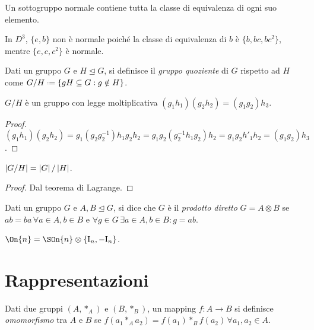 Un sottogruppo normale contiene tutta la classe di equivalenza di ogni suo elemento.

\begin{example}
	In $ D^3 $, $ \{e,b\} $ non è normale poiché la classe di equivalenza di $ b $ è $ \{b,bc,bc^2\} $, mentre $ \{e,c,c^2\} $ è normale.
\end{example}

\begin{definition}
	Dati un gruppo $ G $ e $ H \trianglelefteq G $, si definisce il \textit{gruppo quoziente} di $ G $ rispetto ad $ H $ come $ G / H \defeq \{gH \subseteq G : g \notin H\} $.
\end{definition}

\begin{proposition}
	$ G / H $ è un gruppo con legge moltiplicativa $ (g_1 h_1) (g_2 h_2) = (g_1 g_2) h_3 $.
\end{proposition}
\begin{proof}
	$ (g_1 h_1) (g_2 h_2) = g_1 (g_2 g_2^{-1}) h_1 g_2 h_2 = g_1 g_2 (g_2^{-1} h_1 g_2) h_2 = g_1 g_2 h'_1 h_2 = (g_1 g_2) h_3 $.
\end{proof}

\begin{proposition}
	$ \left\lvert G / H\right\rvert = \left\lvert G\right\rvert / \left\lvert H\right\rvert $.
\end{proposition}
\begin{proof}
	Dal teorema di Lagrange.
\end{proof}

\begin{definition}
	Dati un gruppo $ G $ e $ A,B \trianglelefteq G $, si dice che $ G $ è il \textit{prodotto diretto} $ G = A \otimes B $ se $ ab = ba \,\forall a \in A,b \in B $ e $ \forall g \in G \,\exists a \in A, b \in B : g = ab $.
\end{definition}

\begin{example}
	$ \On{n} = \SOn{n} \otimes \{\tens{I}_n, -\tens{I}_n\} $.
\end{example}

\section{Rappresentazioni}

\begin{definition}
	Dati due gruppi $ (A,*_A) $ e $ (B,*_B) $, un mapping $ f : A \rightarrow B $ si definisce \textit{omomorfismo} tra $ A $ e $ B $ se $ f(a_1 *_A a_2) = f(a_1) *_B f(a_2) \,\forall a_1,a_2 \in A $.
\end{definition}

